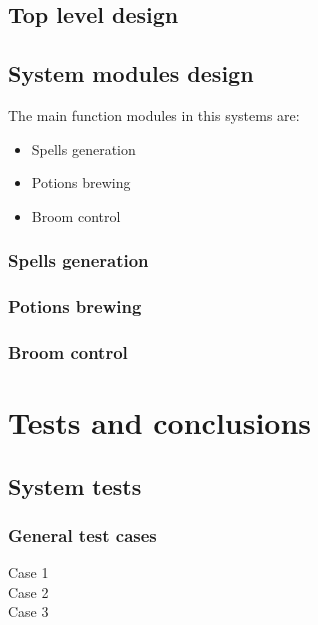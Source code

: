 \documentclass{swfuthesise}
\begin{document}
\section{Top level design}

\lipsum[32-34]

\section{System modules design}

The main function modules in this systems are:
\begin{itemize}
\item Spells generation
\item Potions brewing
\item Broom control
\end{itemize}

\subsection{Spells generation}
\lipsum[35-36]

\subsection{Potions brewing}
\lipsum[37-38]

\subsection{Broom control}
\lipsum[39-40]

\chapter{Tests and conclusions}

\section{System tests}

\subsection{General test cases}

\begin{description}
\item[Case 1] \lipsum[37]
\item[Case 2] \lipsum[38]
\item[Case 3] \lipsum[39]
\end{description}
\end{document}
